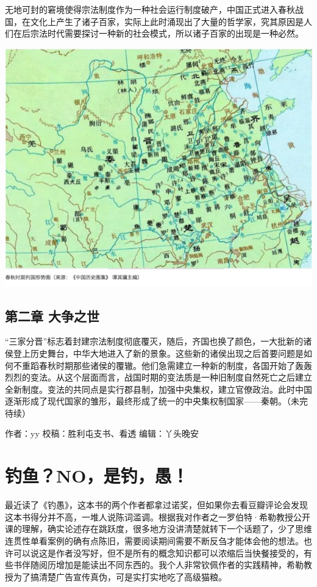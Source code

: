 \documentclass[]{book}
\begin{document}
无地可封的窘境使得宗法制度作为一种社会运行制度破产，中国正式进入春秋战国，在文化上产生了诸子百家，实际上此时涌现出了大量的哲学家，究其原因是人们在后宗法时代需要探讨一种新的社会模式，所以诸子百家的出现是一种必然。

\includegraphics[width=8.33in]{images/gx4}

\hypertarget{ux7b2cux4e8cux7ae0-ux5927ux4e89ux4e4bux4e16}{%
\subsection{第二章 大争之世}\label{ux7b2cux4e8cux7ae0-ux5927ux4e89ux4e4bux4e16}}

``三家分晋''标志着封建宗法制度彻底覆灭，随后，齐国也换了颜色，一大批新的诸侯登上历史舞台，中华大地进入了新的景象。这些新的诸侯出现之后首要问题是如何不重蹈春秋时期那些诸侯的覆辙。他们急需建立一种新的制度，各国开始了轰轰烈烈的变法。从这个层面而言，战国时期的变法质是一种旧制度自然死亡之后建立全新制度。变法的共同点是实行郡县制，加强中央集权，建立官僚政治。此时中国逐渐形成了现代国家的雏形，最终形成了统一的中央集权制国家------秦朝。（未完待续）

作者：yy
校稿：胜利屯支书、看透
编辑：丫头晚安

\hypertarget{ux9493ux9c7cnoux662fux9493ux611a}{%
\section{钓鱼？NO，是钓，愚！}\label{ux9493ux9c7cnoux662fux9493ux611a}}

最近读了《钓愚》，这本书的两个作者都拿过诺奖，但如果你去看豆瓣评论会发现这本书得分并不高，一堆人说陈词滥调。根据我对作者之一罗伯特·希勒教授公开课的理解，确实论述存在跳跃度，很多地方没讲清楚就转下一个话题了，少了思维连贯性单看案例的确有点陈旧，需要阅读期间需要不断反刍才能体会他的想法。也许可以说这是作者没写好，但不是所有的概念知识都可以浓缩后当快餐接受的，有些书伴随阅历增加是能读出不同东西的。我个人非常钦佩作者的实践精神，希勒教授为了搞清楚广告宣传真伪，可是实打实地吃了高级猫粮。
\end{document}
